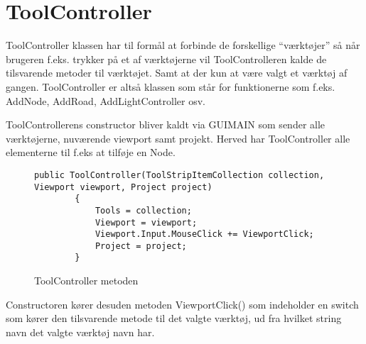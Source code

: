 \section{ToolController}\label{ToolController}

ToolController klassen har til formål at forbinde de forskellige “værktøjer” så når brugeren f.eks. trykker på et af værktøjerne vil ToolControlleren kalde de tilsvarende metoder til værktøjet. Samt at der kun at være valgt et værktøj af gangen. ToolController er altså klassen som står for funktionerne som f.eks. AddNode, AddRoad, AddLightController osv.

\vspace{5mm}

ToolControllerens constructor bliver kaldt via GUIMAIN som sender alle værktøjerne, nuværende viewport samt projekt. Herved har ToolController alle elementerne til f.eks at tilføje en Node.

\begin{figure}[H]
\begin{lstlisting}
public ToolController(ToolStripItemCollection collection, Viewport viewport, Project project)
        {
            Tools = collection;
            Viewport = viewport;
            Viewport.Input.MouseClick += ViewportClick;
            Project = project;
        }
\end{lstlisting}
\caption{ToolController metoden}\label{ToolControllerCode}
\end{figure}

\vspace{5mm}

Constructoren kører desuden metoden ViewportClick() som indeholder en switch som kører den tilsvarende metode til det valgte værktøj, ud fra hvilket string navn det valgte værktøj navn har.

